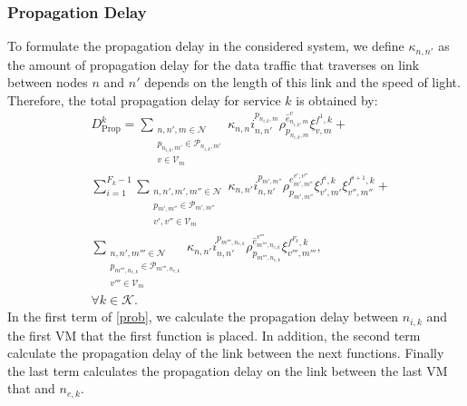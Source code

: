 \documentclass[20pt,twocolumn]{IEEEtran}
\begin{document}
\subsubsection{{ Propagation Delay}}
To formulate the propagation delay in the considered system, we define $\kappa_{n,n'}$%
as  the amount of propagation delay for the data traffic that traverses on link between nodes $n$ and $n'$  depends on the length of  this link and the speed of light. Therefore, the total propagation delay for service $k$ is obtained by:
\begin{align}
\label{prob}
&D^{k}_{\text{Prop}}=
\sum_{\substack{{n,n',m}\in\mathcal{N}\\ p_{n_{i,k},m'}\in\mathcal{P}_{n_{i,k},m'}\\v\in\mathcal{V}_m}}
 \kappa_{n,n}i^{p_{n_{i,k},m}}_{n,n'}\rho^{\hat{e}^{v}_{n_{i,k},m}}_{p_{n_{i,k},m}}\xi^{f^{1},k}_{v,m}+\\
\nonumber
&\sum^{F_k-1}_{i=1}\sum_{\substack {{n,n',m',m''}\in\mathcal{N}\\p_{m',m''}\in\mathcal{P}_{m',m''}\\ v',v''\in\mathcal{V}_m}}
 \kappa_{n,n'}i^{p_{m',m''}}_{n,n'}\rho^{e^{v',v''}_{m',m''}}_{p_{m',m''}}\xi^{f^{i},k}_{v',m'}\xi^{f^{i+1},k}_{v'',m''}+\\
 \nonumber
&%
\sum_{\substack{n,n',m'''\in\mathcal{N}\\ p_{m''',n_{e,k}}\in\mathcal{P}_{m''',n_{e,k}}\\{v'''\in\mathcal{V}_m}}}\kappa_{{n,n'}} i^{p_{m''',n_{e,k}}}_{{n,n'}}\rho^{\hat{e}^{v'''}_{m''',n_{e,k}}}_{p_{m''',n_{e,k}}}\xi^{f^{F_k},k}_{v''',m'''},\\& \nonumber \forall k\in\mathcal{K}.
\end{align}
In the first term of \eqref{prob}, we calculate the propagation delay between $n_{i,k}$ and the first VM that the first  function is placed. In addition, the second term calculate the propagation delay of the link between the next functions. Finally the last term calculates the propagation delay on the link between the last VM that and $n_{e,k}$.
\end{document}
